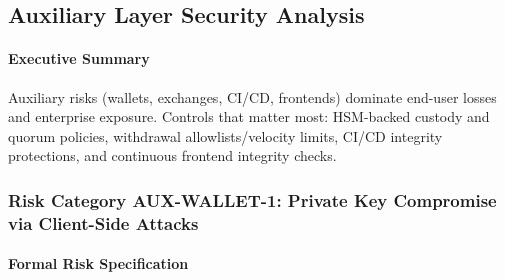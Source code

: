 \subsection{Auxiliary Layer Security Analysis}
\label{sec:results_auxiliary}

\paragraph{Executive Summary}
Auxiliary risks (wallets, exchanges, CI/CD, frontends) dominate end-user losses and enterprise exposure. Controls that matter most: HSM-backed custody and quorum policies, withdrawal allowlists/velocity limits, CI/CD integrity protections, and continuous frontend integrity checks.

\subsubsection{Risk Category AUX-WALLET-1: Private Key Compromise via Client-Side Attacks}

\paragraph{Formal Risk Specification}

